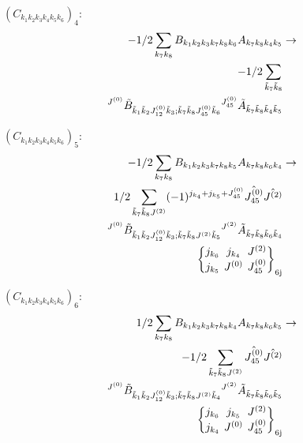 \documentclass[11pt]{article}
\newcommand{\sixj}[6]{\begingroup\setlength{\arraycolsep}{0.2em}\begin{Bmatrix} #1 & #2 & #3 \\ #4 & #5 & #6 \end{Bmatrix}_{\text{6j}}\endgroup}
\begin{document}
$\left({C}_{{k}_{1}{k}_{2}{k}_{3}{k}_{4}{k}_{5}{k}_{6}}\right)_{4}$:
\begin{align}
-1/2\sum_{{k}_{7}{k}_{8}}{B}_{{k}_{1}{k}_{2}{k}_{3}{k}_{7}{k}_{8}{k}_{6}}{A}_{{k}_{7}{k}_{8}{k}_{4}{k}_{5}}&\rightarrow \notag \\-1/2\sum_{\tilde{k}_{7}\tilde{k}_{8}}& \notag \\{}^{J^{(0)}}\tilde{B}_{\tilde{k}_{1}\tilde{k}_{2}J^{(0)}_{12}\tilde{k}_{3};\tilde{k}_{7}\tilde{k}_{8}J^{(0)}_{45}\tilde{k}_{6}}{}^{J^{(0)}_{45}}\tilde{A}_{\tilde{k}_{7}\tilde{k}_{8}\tilde{k}_{4}\tilde{k}_{5}}& \notag \\
\end{align}

$\left({C}_{{k}_{1}{k}_{2}{k}_{3}{k}_{4}{k}_{5}{k}_{6}}\right)_{5}$:
\begin{align}
-1/2\sum_{{k}_{7}{k}_{8}}{B}_{{k}_{1}{k}_{2}{k}_{3}{k}_{7}{k}_{8}{k}_{5}}{A}_{{k}_{7}{k}_{8}{k}_{6}{k}_{4}}&\rightarrow \notag \\1/2\sum_{\tilde{k}_{7}\tilde{k}_{8}J^{(2)}}(-1)^{j_{{k}_{4}} +j_{{k}_{5}} +J^{(0)}_{45} }\hat{J^{(0)}_{45}}\hat{J^{(2)}}& \notag \\{}^{J^{(0)}}\tilde{B}_{\tilde{k}_{1}\tilde{k}_{2}J^{(0)}_{12}\tilde{k}_{3};\tilde{k}_{7}\tilde{k}_{8}J^{(2)}\tilde{k}_{5}}{}^{J^{(2)}}\tilde{A}_{\tilde{k}_{7}\tilde{k}_{8}\tilde{k}_{6}\tilde{k}_{4}}& \notag \\\sixj{j_{{k}_{6}}}{j_{{k}_{4}}}{J^{(2)}}{j_{{k}_{5}}}{J^{(0)}}{J^{(0)}_{45}}
\end{align}

$\left({C}_{{k}_{1}{k}_{2}{k}_{3}{k}_{4}{k}_{5}{k}_{6}}\right)_{6}$:
\begin{align}
1/2\sum_{{k}_{7}{k}_{8}}{B}_{{k}_{1}{k}_{2}{k}_{3}{k}_{7}{k}_{8}{k}_{4}}{A}_{{k}_{7}{k}_{8}{k}_{6}{k}_{5}}&\rightarrow \notag \\-1/2\sum_{\tilde{k}_{7}\tilde{k}_{8}J^{(2)}}\hat{J^{(0)}_{45}}\hat{J^{(2)}}& \notag \\{}^{J^{(0)}}\tilde{B}_{\tilde{k}_{1}\tilde{k}_{2}J^{(0)}_{12}\tilde{k}_{3};\tilde{k}_{7}\tilde{k}_{8}J^{(2)}\tilde{k}_{4}}{}^{J^{(2)}}\tilde{A}_{\tilde{k}_{7}\tilde{k}_{8}\tilde{k}_{6}\tilde{k}_{5}}& \notag \\\sixj{j_{{k}_{6}}}{j_{{k}_{5}}}{J^{(2)}}{j_{{k}_{4}}}{J^{(0)}}{J^{(0)}_{45}}
\end{align}
\end{document}
